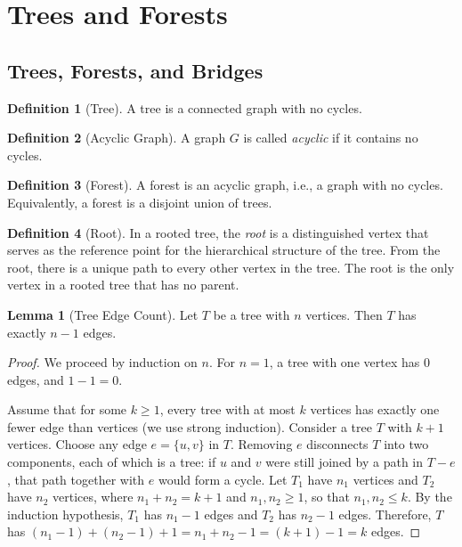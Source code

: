 \documentclass{article}
\theoremstyle{definition}
\newtheorem{lemma}{Lemma}
\newtheorem{definition}{Definition}
\begin{document}
\pagebreak
\section{Trees and Forests}\label{sec:trees}

\subsection{Trees, Forests, and Bridges}\label{subsec:trees-forests-bridges}

\begin{definition}[Tree]
A tree is a connected graph with no cycles.
\end{definition}

\begin{definition}[Acyclic Graph]
A graph $G$ is called \textit{acyclic} if it contains no cycles.
\end{definition}

\begin{definition}[Forest]
A forest is an acyclic graph, i.e., a graph with no cycles. Equivalently, a forest is a disjoint union of trees.
\end{definition}

\begin{definition}[Root]
In a rooted tree, the \textit{root} is a distinguished vertex that serves as the reference point for the hierarchical structure of the tree. From the root, there is a unique path to every other vertex in the tree. The root is the only vertex in a rooted tree that has no parent.
\end{definition}

\begin{lemma}[Tree Edge Count]
Let $T$ be a tree with $n$ vertices. Then $T$ has exactly $n-1$ edges.
\end{lemma}


\begin{proof}
We proceed by induction on $n$. For $n=1$, a tree with one vertex has 0 edges, and $1-1 = 0$.

Assume that for some $k \geq 1$, every tree with at most $k$ vertices has exactly one fewer edge than vertices (we use strong induction). Consider a tree $T$ with $k+1$ vertices. Choose any edge $e = \{u, v\}$ in $T$. Removing $e$ disconnects $T$ into two components, each of which is a tree: if $u$ and $v$ were still joined by a path in $T - e$, that path together with $e$ would form a cycle. Let $T_1$ have $n_1$ vertices and $T_2$ have $n_2$ vertices, where $n_1 + n_2 = k+1$ and $n_1, n_2 \geq 1$, so that $n_1, n_2 \leq k$. By the induction hypothesis, $T_1$ has $n_1 - 1$ edges and $T_2$ has $n_2 - 1$ edges. Therefore, $T$ has $(n_1 - 1) + (n_2 - 1) + 1 = n_1 + n_2 - 1 = (k+1) - 1 = k$ edges.
\end{proof}
\end{document}

